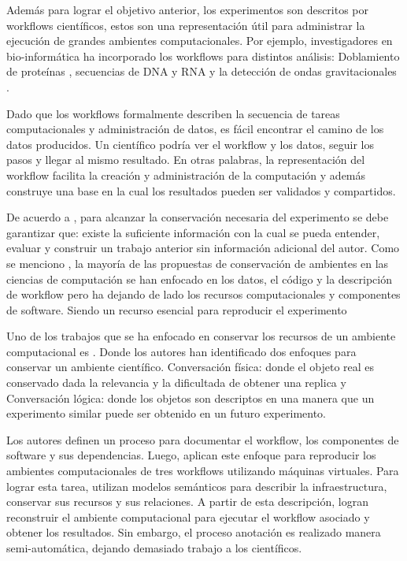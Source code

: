 \documentclass{llncs}
\begin{document}
Además para lograr el objetivo anterior, los experimentos son descritos por workflows científicos, estos son una representación útil para administrar la ejecución de grandes ambientes computacionales.
Por ejemplo, investigadores en bio-informática ha incorporado los workflows para distintos análisis: 
Doblamiento de proteínas \cite{craddock2006science}, secuencias de DNA y RNA \cite{blankenberg2010galaxy,giardine2005galaxy} y la detección de ondas gravitacionales \cite{deelman2004pegasus}.

Dado que los workflows formalmente describen la secuencia de tareas computacionales y administración de datos, es fácil encontrar el camino de los datos producidos.
Un científico podría ver el workflow y los datos, seguir los pasos y llegar al mismo resultado. En otras palabras, la representación del workflow facilita la creación y administración de la computación y además construye una base en la cual los resultados pueden ser validados y compartidos.

De acuerdo a \cite{king1995replication}, para alcanzar la conservación necesaria del experimento se debe garantizar que: existe la suficiente información con la cual se pueda entender, evaluar y construir un trabajo anterior sin información adicional del autor.
Como se menciono  , la mayoría de las propuestas de conservación de ambientes en las ciencias de computación se han enfocado en los datos, el código y la descripción de workflow pero ha dejando de lado los recursos computacionales y componentes de software. Siendo un recurso esencial para reproducir el experimento

Uno de los trabajos que se ha enfocado en conservar los recursos de un ambiente computacional es \cite{santana2017reproducibility}. Donde los autores han identificado dos enfoques para conservar un ambiente científico. Conversación física: donde el objeto real es conservado dada la relevancia y la dificultada de obtener una replica y  Conversación lógica: donde los objetos son descriptos en una manera que un experimento similar puede ser obtenido en un futuro experimento.

Los autores definen un proceso para documentar el workflow, los componentes de software y sus dependencias. Luego, aplican este enfoque para reproducir los ambientes computacionales de tres workflows utilizando máquinas virtuales. Para lograr esta tarea, utilizan modelos semánticos para describir la infraestructura, conservar sus recursos y sus relaciones. A partir de esta descripción, logran reconstruir el ambiente computacional para ejecutar el workflow asociado y obtener los resultados. 
Sin embargo, el proceso anotación es realizado manera semi-automática, dejando demasiado trabajo a los científicos.
\end{document}
